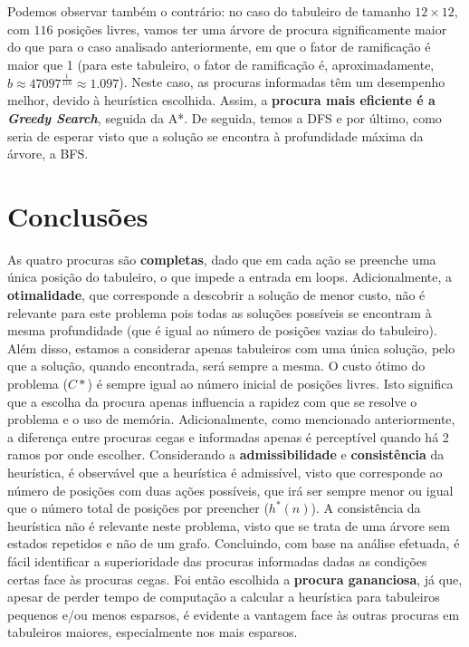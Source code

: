 \documentclass[12pt,a4paper]{article}
\begin{document}
Podemos observar também o contrário: no caso do tabuleiro de tamanho \(12 \times 12\), com \(116\) posições
livres, vamos ter uma árvore de procura significamente maior do que para o caso analisado anteriormente,
em que o fator de ramificação é maior que 1 (para este tabuleiro, o fator de ramificação é,
aproximadamente, \(b \approx 47097^{\frac{1}{116}} \approx 1.097\)).
Neste caso, as procuras informadas têm um desempenho melhor, devido à heurística escolhida.
Assim, a \textbf{procura mais eficiente é a \textit{Greedy Search}}, seguida da A*.
De seguida, temos a DFS e por último, como seria de esperar visto que a solução se encontra
à profundidade máxima da árvore, a BFS.

\section{Conclusões}

As quatro procuras são \textbf{completas}, dado que em cada ação se preenche uma única posição do tabuleiro,
o que impede a entrada em loops.
Adicionalmente, a \textbf{otimalidade}, que corresponde a descobrir a solução de menor custo,
não é relevante para este problema pois todas as soluções possíveis se encontram à mesma profundidade
(que é igual ao número de posições vazias do tabuleiro).
Além disso, estamos a considerar apenas tabuleiros com uma única solução,
pelo que a solução, quando encontrada, será sempre a mesma.
O custo ótimo do problema (\(C*\)) é sempre igual ao número inicial de posições livres.
Isto significa que a escolha da procura apenas influencia a rapidez com que se resolve o problema e o uso de memória.
Adicionalmente, como mencionado anteriormente, a diferença entre procuras cegas e informadas apenas é perceptível quando
há 2 ramos por onde escolher.
Considerando a \textbf{admissibilidade} e \textbf{consistência} da heurística, é observável que
a heurística é admissível, visto que corresponde ao número de posições com duas ações possíveis, que
irá ser sempre menor ou igual que o número total de posições por preencher (\(h^*(n)\)).
A consistência da heurística não é relevante neste problema, visto que se trata de uma árvore sem estados repetidos e não
de um grafo.
Concluindo, com base na análise efetuada, é fácil identificar a superioridade das procuras informadas dadas as
condições certas face às procuras cegas. Foi então escolhida a \textbf{procura gananciosa}, já que,
apesar de perder tempo de computação a calcular a heurística para tabuleiros pequenos e/ou menos esparsos,
é evidente a vantagem face às outras procuras em tabuleiros maiores, especialmente nos mais
esparsos.
\end{document}
